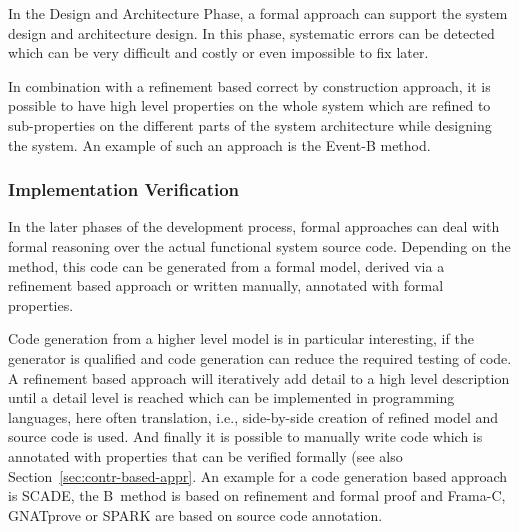 In the Design and Architecture Phase, a formal approach can support the
system design and architecture design. In this phase, systematic errors
can be detected which can be very difficult and costly or even impossible
to fix later.

In combination with a refinement based correct by construction approach,
it is possible to have high level properties on the whole system which
are refined to sub-properties on the different parts of the system
architecture while designing the system. An example of such an approach
is the Event-B method.

\subsubsection{Implementation Verification}
\label{sec:impl-verif}

In the later phases of the development process, formal approaches can
deal with formal reasoning over the actual functional system source
code. Depending on the method, this code can be generated from a formal
model, derived via a refinement based approach or written manually,
annotated with formal properties.

Code generation from a higher level model is in particular interesting,
if the generator is qualified and code generation can reduce the required
testing of code. A refinement based approach will iteratively add detail
to a high level description until a detail level is reached which can be
implemented in programming languages, here often translation, i.e.,
side-by-side creation of refined model and source code is used. And
finally it is possible to manually write code which is annotated with
properties that can be verified formally (see also
Section~\ref{sec:contr-based-appr}. An example for a code generation
based approach is SCADE, the B~method is based on refinement and formal
proof and Frama-C, GNATprove or SPARK are based on source code annotation.

